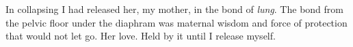 

In collapsing I had released her, my mother, in the bond of {\it
lung}.  The bond from the pelvic floor under the diaphram was maternal
wisdom and force of protection that would not let go.  Her love.  Held
by it until I release myself.

\bye
